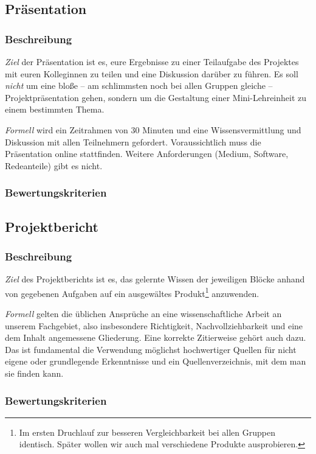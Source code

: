 \documentclass[DIV=15,headinclude]{scrartcl}
\begin{document}
\subsection{Präsentation}

\subsubsection{Beschreibung}

\emph{Ziel} der Präsentation ist es, eure Ergebnisse zu einer Teilaufgabe des Projektes mit euren Kolleginnen zu teilen und eine Diskussion darüber zu führen. Es soll \emph{nicht} um eine bloße – am schlimmsten noch bei allen Gruppen gleiche – Projektpräsentation gehen, sondern um die Gestaltung einer Mini-Lehreinheit zu einem bestimmten Thema.

\emph{Formell} wird ein Zeitrahmen von 30 Minuten und eine Wissensvermittlung und Diskussion mit allen Teilnehmern gefordert. Voraussichtlich muss die Präsentation online stattfinden. Weitere Anforderungen (Medium, Software, Redeanteile) gibt es nicht.

\subsubsection{Bewertungskriterien}


\subsection{Projektbericht}

\subsubsection{Beschreibung}

\emph{Ziel} des Projektberichts ist es, das gelernte Wissen der jeweiligen Blöcke anhand von gegebenen Aufgaben auf ein ausgewältes Produkt\footnote{Im ersten Druchlauf zur besseren Vergleichbarkeit bei allen Gruppen identisch. Später wollen wir auch mal verschiedene Produkte ausprobieren.} anzuwenden.

\emph{Formell} gelten die üblichen Ansprüche an eine wissenschaftliche Arbeit an unserem Fachgebiet, also insbesondere Richtigkeit, Nachvollziehbarkeit und eine dem Inhalt angemessene Gliederung. Eine korrekte Zitierweise gehört auch dazu. Das ist fundamental die Verwendung möglichst hochwertiger Quellen für nicht eigene oder grundlegende Erkenntnisse und ein Quellenverzeichnis, mit dem man sie finden kann.

\subsubsection{Bewertungskriterien}



\end{document}
